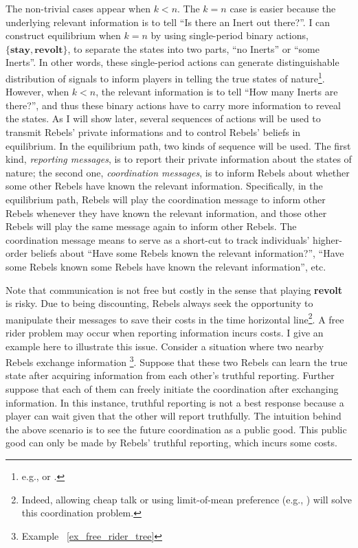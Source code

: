 \documentclass[12pt,letter]{article}
\theoremstyle{definition}
\theoremstyle{remark}
\theoremstyle{claim}
\begin{document}
The non-trivial cases appear when $k<n$. The $k=n$ case is easier because the underlying relevant information is to tell ``Is there an Inert out there?''. I can construct equilibrium when $k=n$ by using single-period binary actions, $\{\textbf{stay},\textbf{revolt}\}$, to separate the states into two parts, ``no Inerts'' or ``some Inerts''. In other words, these single-period actions can generate distinguishable distribution of signals to inform players in telling the true states of nature\footnote{e.g., \citep{Fudenberg2010} or \citep{Fudenberg2011}.}. However, when $k<n$, the relevant information is to tell ``How many Inerts are there?'', and thus these binary actions have to carry more information to reveal the states. As I will show later, several sequences of actions will be used to transmit Rebels' private informations and to control Rebels' beliefs in equilibrium. In the equilibrium path, two kinds of sequence will be used. The first kind, \textit{reporting messages}, is to report their private information about the states of nature; the second one, \textit{coordination messages}, is to inform Rebels about whether some other Rebels have known the relevant information.  Specifically, in the equilibrium path, Rebels will play the coordination message to inform other Rebels whenever they have known the relevant information, and those other Rebels will play the same message again to inform other Rebels. The coordination message means to serve as a short-cut to track individuals' higher-order beliefs about ``Have some Rebels known the relevant information?'', ``Have some Rebels known some Rebels have known the relevant information'', etc.


Note that communication is not free but costly in the sense that playing \textbf{revolt} is risky. Due to being discounting, Rebels always seek the opportunity to manipulate their messages to save their costs in the time horizontal line\footnote{Indeed, allowing cheap talk or using limit-of-mean preference (e.g., \citep{Renault1998}) will solve this coordination problem.}. A free rider problem may occur when reporting information incurs costs. I give an example here to illustrate this issue. Consider a situation where two nearby Rebels exchange information \footnote{Example ~\ref{ex_free_rider_tree}}. Suppose that these two Rebels can learn the true state after acquiring information from each other's truthful reporting. Further suppose that each of them can freely initiate the coordination after exchanging information. In this instance, truthful reporting is not a best response because a player can wait given that the other will report truthfully. The intuition behind the above scenario is to see the future coordination as a public good. This public good can only be made by Rebels' truthful reporting, which incurs some costs.
\end{document}

